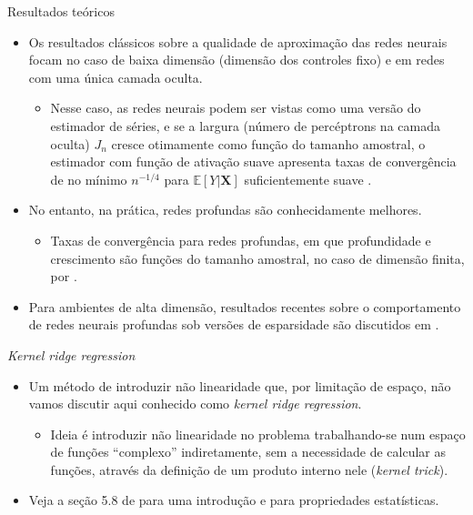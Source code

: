 \documentclass[11pt]{beamer}
\begin{document}
\begin{frame}{Resultados teóricos}
\begin{itemize}
	\item Os resultados clássicos sobre a qualidade de aproximação das redes neurais focam no caso de baixa dimensão (dimensão dos controles fixo) e em redes com uma única camada oculta.
	\begin{itemize}
		\item Nesse caso, as redes neurais podem ser vistas como uma versão do estimador de séries, e se a largura (número de percéptrons na camada oculta) $J_n$ cresce otimamente como função do tamanho amostral, o estimador com função de ativação suave apresenta taxas de convergência de no mínimo $n^{-1/4}$ para $\mathbb{E}[Y|\boldsymbol{X}]$ suficientemente suave \citep{Chen1999,chen2007}.
	\end{itemize}
	\item No entanto, na prática, redes profundas são conhecidamente melhores.
	\begin{itemize}
		\item Taxas de convergência para redes profundas, em que profundidade e crescimento são funções do tamanho amostral, no caso de dimensão finita, por \citep{Farrell2021}.
	\end{itemize}
	\item Para ambientes de alta dimensão, resultados recentes sobre o comportamento de redes neurais profundas sob versões de esparsidade são discutidos em \cite{chernozhukov2024appliedcausalinferencepowered}.
\end{itemize}
\end{frame}

\begin{frame}{\textit{Kernel ridge regression}}
\begin{itemize}
	\item Um método de introduzir não linearidade que, por limitação de espaço, não vamos discutir aqui  conhecido como \textit{kernel ridge regression}.
	\begin{itemize}
		\item Ideia é introduzir não linearidade no problema trabalhando-se num espaço de funções ``complexo'' indiretamente, sem a necessidade de calcular as funções, através da definição de um produto interno nele (\textit{kernel trick}).
		
	\end{itemize}
	\item Veja a seção 5.8 de \citet{hastie2009elements} para uma introdução e \citet{singh2023kernelridgeregressioninference} para propriedades estatísticas.
\end{itemize}
\end{frame}
\end{document}
